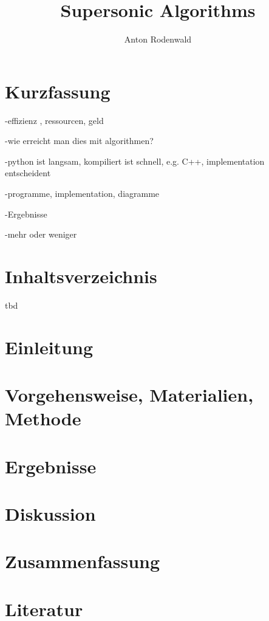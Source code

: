 \documentclass[10pt,a4paper]{article}
\begin{document}
\title{Supersonic Algorithms}
\author{Anton Rodenwald}

\maketitle

\clearpage
\section*{Kurzfassung}
-effizienz , ressourcen, geld

-wie erreicht man dies mit algorithmen?

-python ist langsam, kompiliert ist schnell, e.g. C++, implementation entscheident

-programme, implementation, diagramme

-Ergebnisse

-mehr oder weniger

\clearpage
\section*{Inhaltsverzeichnis}
tbd

\clearpage
\section*{Einleitung}
\clearpage
\section*{Vorgehensweise, Materialien, Methode}
\clearpage
\section*{Ergebnisse}
\clearpage
\section*{Diskussion}
\clearpage
\section*{Zusammenfassung}
\clearpage
\section*{Literatur}
\end{document}
